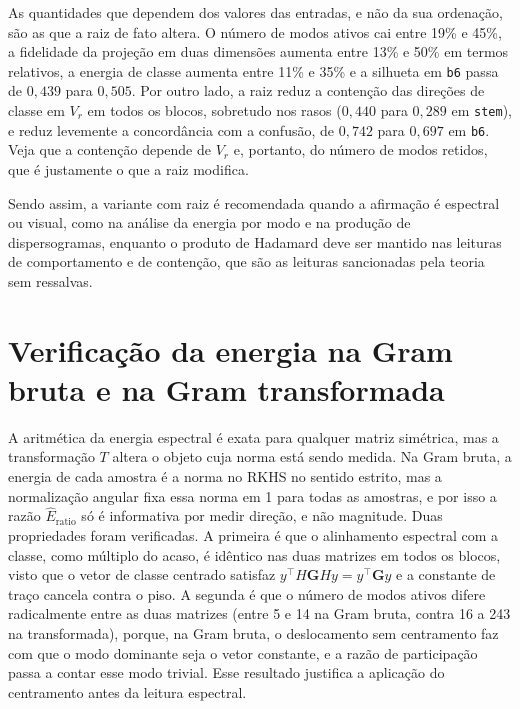 As quantidades que dependem dos valores das entradas, e não da sua ordenação, são as que a raiz de fato altera. O número de modos ativos cai entre 19\% e 45\%, a fidelidade da projeção em duas dimensões aumenta entre 13\% e 50\% em termos relativos, a energia de classe aumenta entre 11\% e 35\% e a silhueta em \texttt{b6} passa de $0{,}439$ para $0{,}505$. Por outro lado, a raiz reduz a contenção das direções de classe em $V_r$ em todos os blocos, sobretudo nos rasos ($0{,}440$ para $0{,}289$ em \texttt{stem}), e reduz levemente a concordância com a confusão, de $0{,}742$ para $0{,}697$ em \texttt{b6}. Veja que a contenção depende de $V_r$ e, portanto, do número de modos retidos, que é justamente o que a raiz modifica.

Sendo assim, a variante com raiz é recomendada quando a afirmação é espectral ou visual, como na análise da energia por modo e na produção de dispersogramas, enquanto o produto de Hadamard deve ser mantido nas leituras de comportamento e de contenção, que são as leituras sancionadas pela teoria sem ressalvas.

\section{Verificação da energia na Gram bruta e na Gram transformada}\label{sec:apendice_bruta}

A aritmética da energia espectral é exata para qualquer matriz simétrica, mas a transformação $T$ altera o objeto cuja norma está sendo medida. Na Gram bruta, a energia de cada amostra é a norma no RKHS no sentido estrito, mas a normalização angular fixa essa norma em 1 para todas as amostras, e por isso a razão $\widehat{E}_{\mathrm{ratio}}$ só é informativa por medir direção, e não magnitude. Duas propriedades foram verificadas. A primeira é que o alinhamento espectral com a classe, como múltiplo do acaso, é idêntico nas duas matrizes em todos os blocos, visto que o vetor de classe centrado satisfaz $y^\top H \mathbf{G} H y = y^\top \mathbf{G} y$ e a constante de traço cancela contra o piso. A segunda é que o número de modos ativos difere radicalmente entre as duas matrizes (entre 5 e 14 na Gram bruta, contra 16 a 243 na transformada), porque, na Gram bruta, o deslocamento sem centramento faz com que o modo dominante seja o vetor constante, e a razão de participação passa a contar esse modo trivial. Esse resultado justifica a aplicação do centramento antes da leitura espectral.
